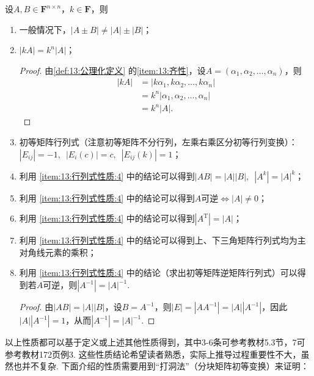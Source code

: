 设$A,B \in \mathbf{F}^{n \times n}$，$k \in \mathbf{F}$，则
\begin{enumerate}
    \item 一般情况下，$|A \pm B| \neq |A|\pm|B|$；

    \item $|kA|=k^n|A|$；
          \begin{proof}
              由\autoref{def:13:公理化定义} 的\ref*{item:13:齐性}，设$A=(\alpha_1,\alpha_2,\ldots,\alpha_n)$，则
              \begin{align*}
                  |kA| & =|k\alpha_1,k\alpha_2,\ldots,k\alpha_n| \\
                       & =k^n|\alpha_1,\alpha_2,\ldots,\alpha_n| \\
                       & =k^n|A|.
              \end{align*}
          \end{proof}

    \item \label{item:13:行列式性质:4}
          初等矩阵行列式（注意初等矩阵不分行列，左乘右乘区分初等行列变换）：\\
          $|E_{ij}|=-1,\enspace |E_i(c)|=c,\enspace |E_{ij}(k)|=1$；

    \item 利用 \ref*{item:13:行列式性质:4} 中的结论可以得到$|AB|=|A||B|,\enspace|A^k|=|A|^k$；

    \item 利用 \ref*{item:13:行列式性质:4} 中的结论可以得到$A$可逆$\iff |A| \neq 0$；

    \item 利用 \ref*{item:13:行列式性质:4} 中的结论可以得到$|A^\mathrm{T}|=|A|$；

    \item 利用 \ref*{item:13:行列式性质:4} 中的结论可以得到上、下三角矩阵行列式均为主对角线元素的乘积；

    \item 利用 \ref*{item:13:行列式性质:4} 中的结论（求出初等矩阵逆矩阵行列式）可以得到若$A$可逆，则$|A^{-1}|=|A|^{-1}$.
          \begin{proof}
              由$|AB|=|A||B|$，设$B=A^{-1}$，则$|E|=|AA^{-1}|=|A||A^{-1}|$，因此$|A||A^{-1}|=1$，从而$|A^{-1}|=|A|^{-1}$.
          \end{proof}
\end{enumerate}

以上性质都可以基于定义或上述其他性质得到，其中3-6条可参考教材5.3节，7可参考教材172页例3. 这些性质结论希望读者熟悉，实际上推导过程重要性不大，虽然也并不复杂. 下面介绍的性质需要用到``打洞法''（分块矩阵初等变换）来证明：

